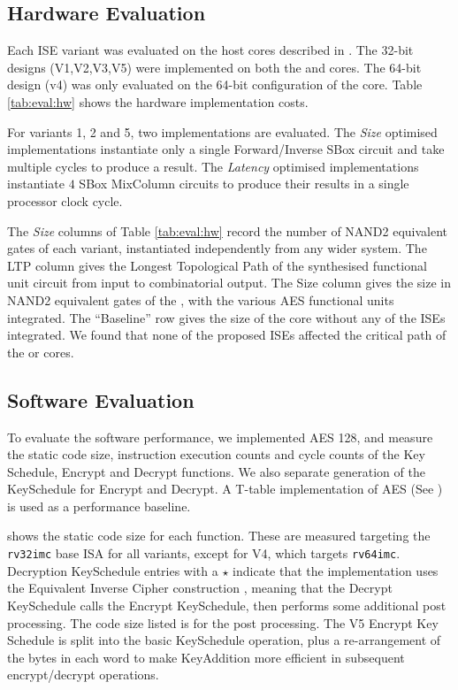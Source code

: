 
\subsection{Hardware Evaluation}
\label{sec:eval:hw}

Each ISE variant was evaluated on the host cores
described in .
The 32-bit designs (V1,V2,V3,V5) were implemented on both the
 and  cores.
The 64-bit design (v4) was only evaluated on the 64-bit configuration
of the  core.
Table \ref{tab:eval:hw} shows the hardware implementation costs.

For variants 1, 2 and 5, two implementations are evaluated.
The {\em Size} optimised implementations instantiate only a single
Forward/Inverse SBox circuit and take multiple cycles
to produce a result.
The {\em Latency} optimised implementations instantiate $4$ SBox
MixColumn circuits to produce their results in a single processor 
clock cycle.

The {\em Size} columns of Table \ref{tab:eval:hw} 
record the number of NAND2 equivalent gates of each variant,
instantiated independently from any wider system.
The LTP column gives the Longest Topological Path of the synthesised
functional unit circuit from input to combinatorial output.
The  Size column gives the size in NAND2 equivalent gates of the
, with the various AES functional units integrated.
The ``Baseline'' row gives the size of the core without any of the
ISEs integrated.
We found that none of the proposed ISEs affected the critical
path of the  or  cores.



\subsection{Software Evaluation}
\label{sec:eval:sw}

To evaluate the software performance, we implemented AES 128, and
measure the static code size, instruction execution counts and cycle
counts of the Key Schedule, Encrypt and Decrypt functions.
We also separate generation of the KeySchedule for Encrypt and Decrypt.
A T-table implementation of AES (See )
is used as a performance baseline.

 shows the static code size for each
function.
These are measured targeting the {\tt rv32imc} base ISA for all variants,
except for V4, which targets {\tt rv64imc}.
Decryption KeySchedule entries with a $\star$ indicate that the
implementation uses the Equivalent Inverse Cipher construction
\cite[Section 5.3.5, Page 23]{FIPS:197}, meaning that the
Decrypt KeySchedule calls the Encrypt KeySchedule, then performs some
additional post processing. The code size listed is for the post processing.
The V5 Encrypt Key Schedule is split into the basic KeySchedule
operation, plus a re-arrangement of the bytes in each word to make
KeyAddition more efficient in subsequent encrypt/decrypt operations.

